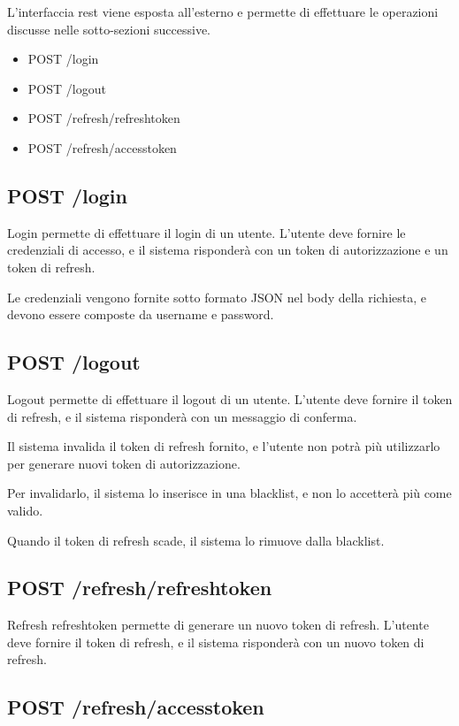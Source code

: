 L'interfaccia rest viene esposta all'esterno e permette di effettuare le operazioni discusse nelle sotto-sezioni successive.

\begin{itemize}
    \item POST /login
    \item POST /logout
    \item POST /refresh/refreshtoken
    \item POST /refresh/accesstoken
\end{itemize}

\subsection{POST /login}

Login permette di effettuare il login di un utente. L'utente deve fornire le credenziali di accesso, e il sistema risponderà con un token di autorizzazione e un token di refresh.

Le credenziali vengono fornite sotto formato JSON nel body della richiesta, e devono essere composte da username e password.

\subsection{POST /logout}

Logout permette di effettuare il logout di un utente. L'utente deve fornire il token di refresh, e il sistema risponderà con un messaggio di conferma.

Il sistema invalida il token di refresh fornito, e l'utente non potrà più utilizzarlo per generare nuovi token di autorizzazione.

Per invalidarlo, il sistema lo inserisce in una blacklist, e non lo accetterà più come valido.

Quando il token di refresh scade, il sistema lo rimuove dalla blacklist.

\subsection{POST /refresh/refreshtoken}

Refresh refreshtoken permette di generare un nuovo token di refresh. L'utente deve fornire il token di refresh, e il sistema risponderà con un nuovo token di refresh.

\subsection{POST /refresh/accesstoken}

